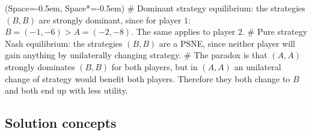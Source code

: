 \documentclass[12pt, a4paper]{article}
\newcommand{\listSpace}{-0.5em}%
\begin{document}
\begin{easylist}[itemize]
	\ListProperties(Space=\listSpace, Space*=\listSpace)
	# Dominant strategy equilibrium: the strategies $(B, B)$ are strongly dominant, since for player $1$: $B = (-1 ,-6) > A = (-2, -8)$.
	The same applies to player $2$.
	# Pure strategy Nash equilibrium: the strategies $(B, B)$ are a PSNE, since neither player will gain anything by unilaterally changing strategy.
	# The paradox is that $(A, A)$ strongly dominates $(B, B)$ for both players, but in $(A, A)$ an unilateral change of strategy would benefit both players.
	Therefore they both change to $B$ and both end up with less utility.
\end{easylist}

\subsection{Solution concepts}
\end{document}
